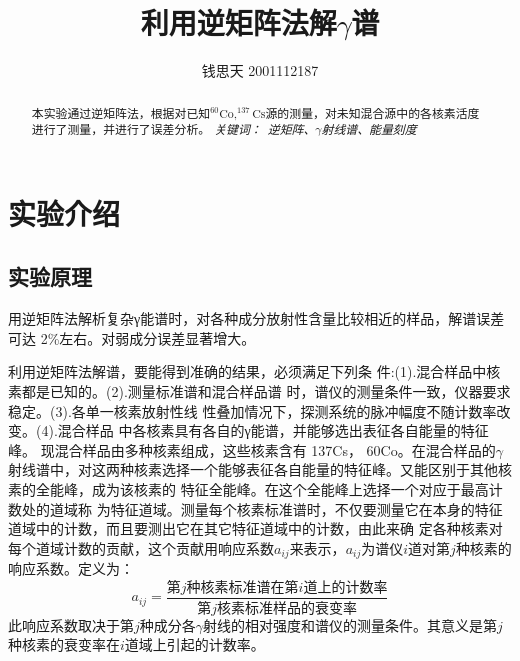 \documentclass{article}
\title{利用逆矩阵法解$\gamma$谱}
\author{钱思天 2001112187}
\begin{document}
    \maketitle
    \begin{abstract}
        本实验通过逆矩阵法，根据对已知$^{60}\text{Co},^{137}\text{Cs}$源的测量，对未知混合源中的各核素活度进行了测量，并进行了误差分析。
        \newline
        \newline
        {\emph{ 关键词：\ 逆矩阵、$\gamma$射线谱、能量刻度 }\rm}

    \end{abstract}

    \section{实验介绍}
    \subsection{实验原理}
    用逆矩阵法解析复杂γ能谱时，对各种成分放射性含量比较相近的样品，解谱误差可达 2\%左右。对弱成分误差显著增大。

    利用逆矩阵法解谱，要能得到准确的结果，必须满足下列条 件:(1).混合样品中核素都是已知的。(2).测量标准谱和混合样品谱 时，谱仪的测量条件一致，仪器要求稳定。(3).各单一核素放射性线 性叠加情况下，探测系统的脉冲幅度不随计数率改变。(4).混合样品 中各核素具有各自的γ能谱，并能够选出表征各自能量的特征峰。
现混合样品由多种核素组成，这些核素含有 137Cs， 60Co。在混合样品的$\gamma$射线谱中，对这两种核素选择一个能够表征各自能量的特征峰。又能区别于其他核素的全能峰，成为该核素的 特征全能峰。在这个全能峰上选择一个对应于最高计数处的道域称 为特征道域。测量每个核素标准谱时，不仅要测量它在本身的特征 道域中的计数，而且要测出它在其它特征道域中的计数，由此来确 定各种核素对每个道域计数的贡献，这个贡献用响应系数$a_{ij}$来表示，$a_{ij}$为谱仪$i$道对第$j$种核素的响应系数。定义为：
\begin{equation}
    a_{ij}=\frac{\text{第}j\text{种核素标准谱在第}i\text{道上的计数率}}{\text{第}j\text{核素标准样品的衰变率}}
\end{equation}
此响应系数取决于第$j$种成分各$\gamma$射线的相对强度和谱仪的测量条件。其意义是第$j$种核素的衰变率在$i$道域上引起的计数率。
\end{document}
